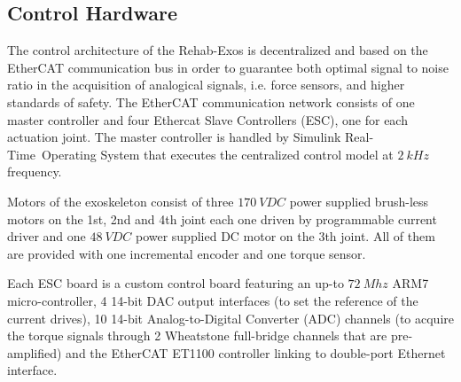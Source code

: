 \subsection{Control Hardware}
The control architecture of the Rehab-Exos is decentralized and based on the EtherCAT communication bus in order to guarantee both optimal signal to noise ratio in the acquisition of analogical signals, i.e. force sensors, and higher standards of safety.
The EtherCAT communication network consists of one master controller and four Ethercat Slave Controllers (ESC), one for each actuation joint.
The master controller is handled by Simulink Real-Time\texttrademark \ Operating System that executes the centralized control model at $2 \ kHz$ frequency.

Motors of the exoskeleton consist of three $170 \ VDC$ power supplied brush-less motors on the 1st, 2nd and 4th joint each one driven by programmable current driver and one $48 \ VDC$ power supplied DC motor on the 3th joint.  All of them are provided with one incremental encoder and one torque sensor.

Each ESC board is a custom control board featuring an up-to $72 \ Mhz$ ARM7 micro-controller, 4 14-bit DAC output interfaces (to set the reference of the current drives), 10 14-bit Analog-to-Digital Converter (ADC) channels (to acquire the torque signals through 2 Wheatstone full-bridge channels that are pre-amplified) and the EtherCAT ET1100 controller linking to double-port Ethernet interface.
